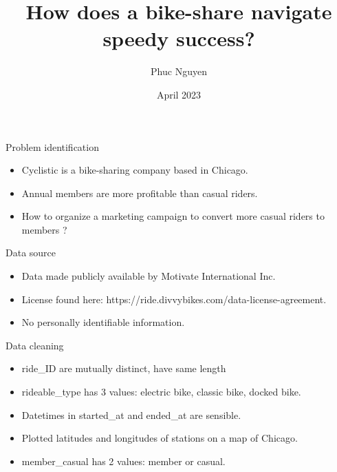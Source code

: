 \documentclass{beamer}
\title[Short title]{How does a bike-share navigate speedy success?} %
\author{Phuc Nguyen} %
\date{April 2023} %
\begin{document}
\begin{frame}
\titlepage %
\end{frame}




\begin{frame}{Problem identification}
    \begin{itemize}
        \item Cyclistic is a bike-sharing company based in Chicago.
        \item Annual members are more profitable than casual riders.
        \item How to organize a marketing campaign to convert more casual riders to members ?
    \end{itemize}
\end{frame}

\begin{frame}{Data source}
\begin{itemize}
    \item Data made publicly available by Motivate International Inc. 
    \item License found here: https://ride.divvybikes.com/data-license-agreement.
    \item No personally identifiable information.
\end{itemize}
\end{frame}

\begin{frame}{Data cleaning}
\begin{itemize}
    \item ride\_ID are mutually distinct, have same length
    \item rideable\_type has 3 values: electric bike, classic bike, docked bike.
    \item Datetimes in started\_at and ended\_at are sensible.
    \item Plotted latitudes and longitudes of stations on a map of Chicago.
    \item member\_casual has 2 values: member or casual.
\end{itemize}
\end{frame}
\end{document}
